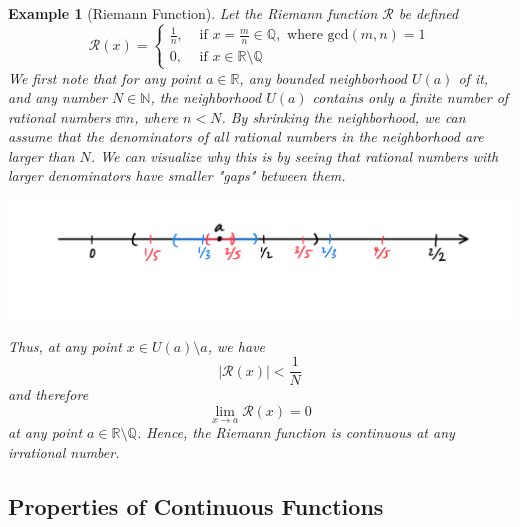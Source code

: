 \documentclass{article}
\newtheorem{example}{Example}[section]
\theoremstyle{remark}
\theoremstyle{definition}
\begin{document}
\begin{example}[Riemann Function]
Let the Riemann function $\mathcal{R}$ be defined
\[\mathcal{R}(x) = \begin{cases}
\frac{1}{n}, & \text{ if } x = \frac{m}{n} \in \mathbb{Q}, \text{ where gcd}(m, n) = 1 \\
0, & \text{ if } x \in \mathbb{R} \setminus \mathbb{Q}
\end{cases}\]
We first note that for any point $a \in \mathbb{R}$, any bounded neighborhood $U(a)$ of it, and any number $N \in \mathbb{N}$, the neighborhood $U(a)$ contains only a finite number of rational numbers $\mathbb{m}{n}$, where $n < N$. By shrinking the neighborhood, we can assume that the denominators of all rational numbers in the neighborhood are larger than $N$. We can visualize why this is by seeing that rational numbers with larger denominators have smaller "gaps" between them. 
\begin{center}
    \includegraphics[scale=0.27]{img/Rationals_Spread_Apart.PNG}
\end{center}
Thus, at any point $x \in U(a) \setminus a$, we have 
\[\big| \mathcal{R}(x) \big| < \frac{1}{N}\]
and therefore
\[\lim_{x \rightarrow a} \mathcal{R} (x) = 0\]
at any point $a \in \mathbb{R} \setminus \mathbb{Q}$. Hence, the Riemann function is continuous at any irrational number. 
\end{example}

\subsection{Properties of Continuous Functions}
\end{document}
